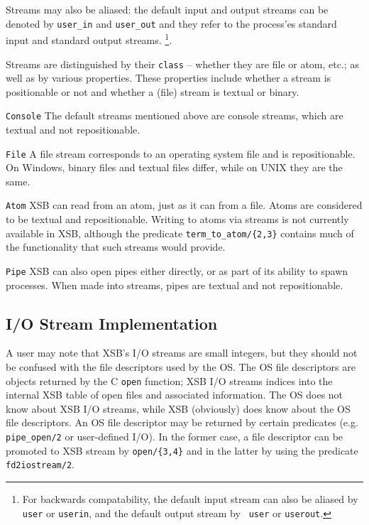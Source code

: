 Streams may also be aliased: the default input and output streams can
be denoted by {\tt user\_in} and {\tt user\_out} and they refer to the
process'es standard input and standard output streams. \footnote{For
backwards compatability, the default input stream can also be aliased
by {\tt user} or {\tt userin}, and the default output stream by {\tt
user} or {\tt userout}.}.

Streams are distinguished by their {\tt class} -- whether they are
file or atom, etc.; as well as by various properties.  These
properties include whether a stream is positionable or not and whether
a (file) stream is textual or binary.

\bi
\item {\tt Console} The default streams mentioned above are
console streams, which are textual and not repositionable.
%
\item {\tt File}  A file stream corresponds to an operating system
file and is repositionable.  On Windows, binary files and textual
files differ, while on UNIX they are the same.  
%
\item {\tt Atom} XSB can read from an atom, just as it can from a file.
Atoms are considered to be textual and repositionable.  Writing to
atoms via streams is not currently available in XSB, although 
the predicate {\tt term\_to\_atom/\{2,3\}} contains much of the
functionality that such streams would provide.

\item {\tt Pipe} XSB can also open pipes either directly, or as part
of its ability to spawn processes.  When made into streams, pipes are
textual and not repositionable.
\ei

\subsection{I/O Stream Implementation}

A user may note that XSB's I/O streams are small integers, but they
should not be confused with the file descriptors used by the OS.  The
OS file descriptors are objects returned by the C {\tt open} function;
XSB I/O streams indices into the internal XSB table of open files and
associated information. The OS does not know about XSB I/O streams,
while XSB (obviously) does know about the OS file descriptors. An OS
file descriptor may be returned by certain predicates (e.g.  {\tt
pipe\_open/2} or user-defined I/O).  In the former case, a file
descriptor can be promoted to XSB stream by {\tt open/\{3,4\}} and in
the latter by using the predicate {\tt fd2iostream/2}.

